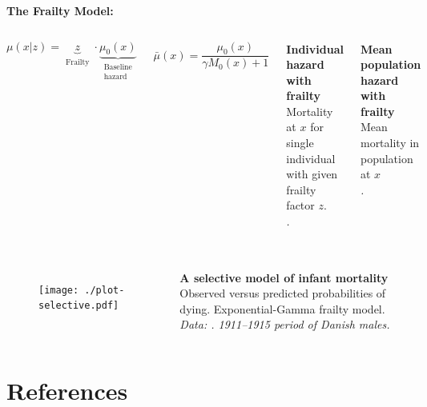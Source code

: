 \documentclass{beamer}
\begin{document}
\begin{frame}
\frametitle{\insertsection}

\textbf{The Frailty Model:} 

\vfill

\begin{columns}[c]

\begin{equation*}
\mu(x|z) = \underbrace{z}_{\substack{\text{Frailty}}} \cdot \underbrace{\mu_0(x)}_{\substack{\text{Baseline} \\ \text{hazard}}}
\end{equation*}

\medskip

\begin{equation*}
\bar{\mu}(x) = \frac {\mu_0(x)} {\gamma M_0(x) + 1}
\end{equation*}

\footnotesize\textbf{Individual hazard with frailty}\\ Mortality at $x$ for single individual with given frailty factor $z$. \\ \scriptsize\emph{\cite{Vaupel1979}.}

\medskip

\footnotesize\textbf{Mean population hazard with frailty}\\ Mean mortality in population at $x$ \\ \scriptsize\emph{\cite{Vaupel1979}.}

\end{columns}

\end{frame}

%

\begin{frame}
\frametitle{\insertsection}

\begin{columns}[c]

\begin{figure}[htb!]
\texttt{[image: ./plot-selective.pdf]}\\
\end{figure}

\footnotesize\textbf{A selective model of infant mortality}\\ Observed versus predicted probabilities of dying. Exponential-Gamma frailty model. \\ \scriptsize\emph{Data: \cite{Danmark1920}. 1911--1915 period of Danish males.}

\end{columns}

\end{frame}

\section{References} %

\begin{frame}
\frametitle{\insertsection}

\nocite{Hmd2015}

\printbibliography

\end{frame}
\end{document}
